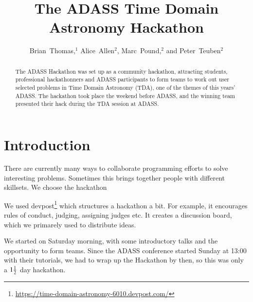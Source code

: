 \documentclass[11pt,twoside]{article}
\begin{document}
\title{The ADASS Time Domain Astronomy Hackathon}
\author{Brian~Thomas,$^1$ Alice~Allen$^2$, Marc~Pound,$^2$ and Peter~Teuben$^2$}



\begin{abstract}

The ADASS Hackathon was set up as a community hackathon, attracting
students, professional hackathonners and ADASS participants to form
teams to work out user selected problems in Time Domain Astronomy
(TDA), one of the themes of this years' ADASS. The hackathon took
place the weekend before ADASS, and the winning team presented their
hack during the TDA session at ADASS.


\end{abstract}



\section{Introduction}

There are currently many ways to collaborate programming efforts to solve interesting problems.
Sometimes this brings together people with different skillsets. We choose the hackathon



We used devpost\footnote{\url{https://time-domain-astronomy-6010.devpost.com/}}
which structures a hackathon a bit. For example, it encourages rules of conduct,
judging, assigning judges etc.  It creates a discussion board, which we primarely used to
distribute ideas.

We started on Saturday morning, with some introductory talks and the opportunity to form teams.
Since the ADASS conference started Sunday at 13:00 with their tutorials, we had to wrap up
the Hackathon by then, so this was only a ${1 {1\over 2}}$ day hackathon.
\end{document}
